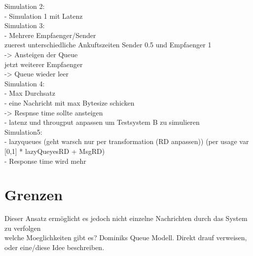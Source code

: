 Simulation 2: \\
- Simulation 1 mit Latenz \\

Simulation 3: \\
- Mehrere Empfaenger/Sender \\
zuerest unterschiedliche Ankuftszeiten Sender 0.5 und Empfaenger 1 \\
-> Ansteigen der Queue \\
jetzt weiterer Empfaenger \\
-> Queue wieder leer\\

Simulation 4: \\
- Max Durchsatz \\
- eine Nachricht mit max Bytesize schicken \\
-> Respnse time sollte ansteigen \\

- latenz und througput anpassen um Testsystem B zu simulieren \\

Simulation5: \\
- lazyqueues (geht warsch nur per transformation (RD anpassen)) (per usage var [0,1] * lazyQueyesRD + MsgRD) \\
- Response time wird mehr \\






\section{Grenzen}
Dieser Ansatz ermöglicht es jedoch nicht einzelne Nachrichten durch das System zu verfolgen\\

welche Moeglichkeiten gibt es? Dominiks Queue Modell. Direkt drauf verweisen, oder eine/diese Idee beschreiben.\\

